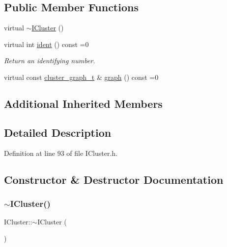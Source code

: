 \subsection*{Public Member Functions}
\begin{DoxyCompactItemize}
\item 
virtual \hyperlink{class_wire_cell_1_1_i_cluster_ac8ac966c34186bb391a28b58e1930258}{$\sim$\+I\+Cluster} ()
\item 
virtual int \hyperlink{class_wire_cell_1_1_i_cluster_a64b77adf75c8a213a355bece6679f1d5}{ident} () const =0
\begin{DoxyCompactList}\small\item\em Return an identifying number. \end{DoxyCompactList}\item 
virtual const \hyperlink{namespace_wire_cell_a6a9ecba14dfba50cdb081820a8bcacbe}{cluster\+\_\+graph\+\_\+t} \& \hyperlink{class_wire_cell_1_1_i_cluster_a974e30bf921937b6b98871525b51dedf}{graph} () const =0
\end{DoxyCompactItemize}
\subsection*{Additional Inherited Members}


\subsection{Detailed Description}


Definition at line 93 of file I\+Cluster.\+h.



\subsection{Constructor \& Destructor Documentation}
\mbox{\label{class_wire_cell_1_1_i_cluster_ac8ac966c34186bb391a28b58e1930258}} 
\subsubsection{\texorpdfstring{$\sim$\+I\+Cluster()}{~ICluster()}}
{\footnotesize\ttfamily I\+Cluster\+::$\sim$\+I\+Cluster (\begin{DoxyParamCaption}{ }\end{DoxyParamCaption})\hspace{0.3cm}{\ttfamily [virtual]}}



